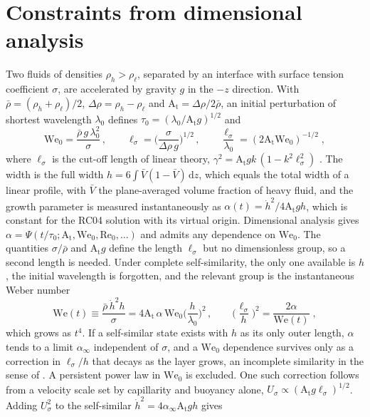\documentclass[lineno]{jfm}
\newcommand{\At}{\mathrm{A_t}}
\newcommand{\We}{\mathrm{We}_0}
\newcommand{\lls}{\ell_\sigma}
\newcommand{\hd}{\dot h}
\begin{document}
\section{Constraints from dimensional analysis}\label{sec:dim}

Two fluids of densities $\rho_h > \rho_\ell$, separated by an interface with surface tension coefficient $\sigma$, are accelerated by gravity $g$ in the $-z$ direction. With $\bar\rho = (\rho_h + \rho_\ell)/2$, $\Delta \rho = \rho_h - \rho_\ell$ and $\At = \Delta \rho/2 \bar\rho$, an initial perturbation of shortest wavelength $\lambda_0$ defines $\tau_0 = (\lambda_0/\At g)^{1/2}$ and
\begin{equation}
  \We = \frac{\bar\rho \, g \, \lambda_0^2}{\sigma} \, , \qquad \lls = \Big(\frac{\sigma}{\Delta \rho \, g}\Big)^{1/2} \, , \qquad \frac{\lls}{\lambda_0} = (2 \At \We)^{-1/2} \;,
  \label{eq:params}
\end{equation}
where $\lls$ is the cut-off length of linear theory, $\gamma^2 = \At g k \,(1 - k^2 \lls^2)$ \citep{Chandrasekhar_book,Sohn2009}. The width is the full width $h = 6 \int \bar V(1 - \bar V) \, \mathrm d z$, which equals the total width of a linear profile, with $\bar V$ the plane-averaged volume fraction of heavy fluid, and the growth parameter is measured instantaneously as $\alpha(t) = \hd^2/4 \At g h$, which is constant for the RC04 solution with its virtual origin. Dimensional analysis gives $\alpha = \Psi(t/\tau_0; \At, \We, \mathrm{Re}_0, \dots)$ and admits any dependence on $\We$. The quantities $\sigma/\bar\rho$ and $\At g$ define the length $\lls$ but no dimensionless group, so a second length is needed. Under complete self-similarity, the only one available is $h$, the initial wavelength is forgotten, and the relevant group is the instantaneous Weber number
\begin{equation}
  \mathrm{We}(t) \equiv \frac{\bar\rho \, \hd^2 h}{\sigma} = 4 \At \, \alpha \, \We \Big(\frac{h}{\lambda_0}\Big)^2 \, , \qquad \Big(\frac{\lls}{h}\Big)^2 = \frac{2 \alpha}{\mathrm{We}(t)} \;,
  \label{eq:We_t}
\end{equation}
which grows as $t^4$. If a self-similar state exists with $h$ as its only outer length, $\alpha$ tends to a limit $\alpha_\infty$ independent of $\sigma$, and a $\We$ dependence survives only as a correction in $\lls/h$ that decays as the layer grows, an incomplete similarity in the sense of \citet{Barenblatt1996}. A persistent power law in $\We$ is excluded. One such correction follows from a velocity scale set by capillarity and buoyancy alone, $U_\sigma \propto (\At g \lls)^{1/2}$. Adding $U_\sigma^2$ to the self-similar $\hd^2 = 4 \alpha_\infty \At g h$ gives
\end{document}

